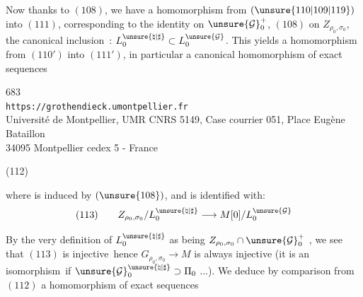 Now thanks to $(108)$, we have a homomorphism from $(\unsure{110|109|119})$ into $(111)$,
corresponding to the identity on $\unsure{\mathcal G}_0^+$,
$(108)$ on $Z_{\rho_0,\sigma_0}$, the canonical inclusion\ :
$L_0^{\unsure{\natural|\sharp}}\subset L_0^{\unsure{\mathcal G}}$.
This yields a homomorphism from $(110')$ into $(111')$, in particular a canonical
homomorphism of exact sequences


\begin{center}
683\\
\texttt{https://grothendieck.umontpellier.fr}\\
Université de Montpellier, UMR CNRS 5149, Case courrier 051, Place Eugène Bataillon\\
34095 Montpellier cedex 5 - France
\end{center}



(112)\quad
{}

where
is  induced by
$(\unsure{108})$, and is identified with:
\[
(113)\qquad Z_{\rho_0,\sigma_0}/L_0^{\unsure{\natural|\sharp}}
\longrightarrow M[0]/L_0^{\unsure{\mathcal G}}
\]

By the very definition of
$L_0^{\unsure{\natural|\sharp}}$ as being
$Z_{\rho_0,\sigma_0}\cap\unsure{\mathcal G}_0^+$
, we see that $(113)$ is injective\ hence
$G_{\rho_0,\sigma_0}\longrightarrow M$ is always injective
(it is an isomorphism\ if
$\unsure{\mathcal G}_0^{\unsure{\natural|\sharp}}\supset\Pi_0$
$\ldots$).
We deduce by comparison from $(112)$ a homomorphism of exact sequences

